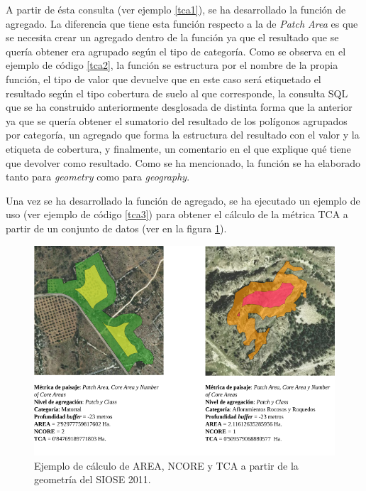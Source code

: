 

A partir de ésta consulta (ver ejemplo \ref{tca1}), se ha desarrollado la función de agregado. La diferencia que tiene esta función respecto a la de \textit{Patch Area} es que se necesita crear un agregado dentro de la función ya que el resultado que se quería obtener era agrupado según el tipo de categoría. Como se observa en el ejemplo de código \ref{tca2}, la función se estructura por el nombre de la propia función, el tipo de valor que devuelve que en este caso será etiquetado el resultado según el tipo cobertura de suelo al que corresponde, la consulta SQL que se ha construido anteriormente desglosada de distinta forma que la anterior ya que se quería obtener el sumatorio del resultado de los polígonos agrupados por categoría, un agregado que forma la estructura del resultado con el valor y la etiqueta de cobertura, y finalmente, un comentario en el que explique qué tiene que devolver como resultado. Como se ha mencionado, la función se ha elaborado tanto para \textit{geometry} como para \textit{geography}.



Una vez se ha desarrollado la función de agregado, se ha ejecutado un ejemplo de uso (ver ejemplo de código \ref{tca3}) para obtener el cálculo de la métrica TCA a partir de un conjunto de datos (ver en la figura \ref{fig:fig_ejemplo}).

\begin{figure}
\begin{center}
\includegraphics[width=\textwidth]{Metodologia/Figs/figuraejemplo.png}
\caption{Ejemplo de cálculo de AREA, NCORE y TCA a partir de la geometría del SIOSE 2011. \label{fig:fig_ejemplo}}
\end{center}
\end{figure}


